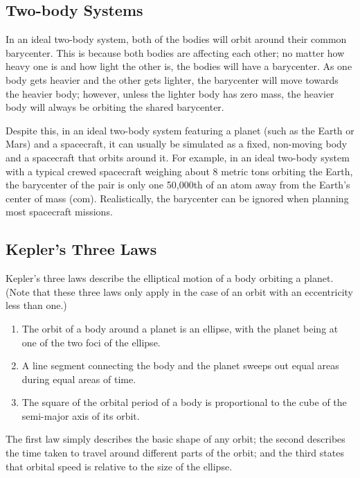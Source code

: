 \subsection{Two-body Systems}

In an ideal two-body system, both of the bodies will orbit around
their common barycenter. This is because both bodies are affecting
each other; no matter how heavy one is and how light the other is, the
bodies will have a barycenter. As one body gets heavier and the other
gets lighter, the barycenter will move towards the heavier body;
however, unless the lighter body has zero mass, the heavier body will
always be orbiting the shared barycenter.


Despite this, in an ideal two-body system featuring a planet (such as
the Earth or Mars) and a spacecraft, it can usually be simulated as a
fixed, non-moving body and a spacecraft that orbits around it. For
example, in an ideal two-body system with a typical crewed spacecraft
weighing about 8 metric tons orbiting the Earth, the barycenter of the
pair is only one 50,000th of an atom away from the Earth's center of
mass (\acrshort{com}). Realistically, the barycenter can be ignored
when planning most spacecraft missions.

\subsection{Kepler's Three Laws}

Kepler's three laws describe the elliptical motion of a body orbiting
a planet. (Note that these three laws only apply in the case of an
orbit with an eccentricity less than one.)

\begin{enumerate}
\item The orbit of a body around a planet is an ellipse, with the planet
  being at one of the two foci of the ellipse.
\item A line segment connecting the body and the planet sweeps out equal
  areas during equal areas of time.
\item The square of the orbital period of a body is proportional to the
  cube of the semi-major axis of its orbit.
\end{enumerate}

The first law simply describes the basic shape of any orbit; the
second describes the time taken to travel around different parts of
the orbit; and the third states that orbital speed is relative to the
size of the ellipse.

